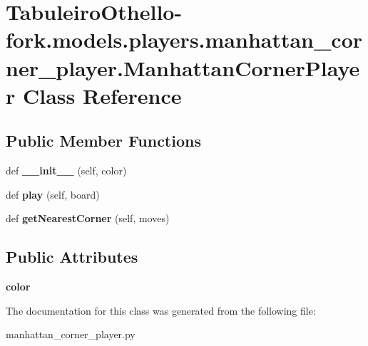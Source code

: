\hypertarget{class_tabuleiro_othello-fork_1_1models_1_1players_1_1manhattan__corner__player_1_1_manhattan_corner_player}{}\section{Tabuleiro\+Othello-\/fork.models.\+players.\+manhattan\+\_\+corner\+\_\+player.\+Manhattan\+Corner\+Player Class Reference}
\label{class_tabuleiro_othello-fork_1_1models_1_1players_1_1manhattan__corner__player_1_1_manhattan_corner_player}
\subsection*{Public Member Functions}
\begin{DoxyCompactItemize}
\item 
\hypertarget{class_tabuleiro_othello-fork_1_1models_1_1players_1_1manhattan__corner__player_1_1_manhattan_corner_player_a3aa3ecc93f83d67e6d2df577948db647}{}def {\bfseries \+\_\+\+\_\+init\+\_\+\+\_\+} (self, color)\label{class_tabuleiro_othello-fork_1_1models_1_1players_1_1manhattan__corner__player_1_1_manhattan_corner_player_a3aa3ecc93f83d67e6d2df577948db647}

\item 
\hypertarget{class_tabuleiro_othello-fork_1_1models_1_1players_1_1manhattan__corner__player_1_1_manhattan_corner_player_a3044a9ec92f9c175462169019c3f3dfd}{}def {\bfseries play} (self, board)\label{class_tabuleiro_othello-fork_1_1models_1_1players_1_1manhattan__corner__player_1_1_manhattan_corner_player_a3044a9ec92f9c175462169019c3f3dfd}

\item 
\hypertarget{class_tabuleiro_othello-fork_1_1models_1_1players_1_1manhattan__corner__player_1_1_manhattan_corner_player_aa02b9b080d54f90c55a77045112f55e1}{}def {\bfseries get\+Nearest\+Corner} (self, moves)\label{class_tabuleiro_othello-fork_1_1models_1_1players_1_1manhattan__corner__player_1_1_manhattan_corner_player_aa02b9b080d54f90c55a77045112f55e1}

\end{DoxyCompactItemize}
\subsection*{Public Attributes}
\begin{DoxyCompactItemize}
\item 
\hypertarget{class_tabuleiro_othello-fork_1_1models_1_1players_1_1manhattan__corner__player_1_1_manhattan_corner_player_a132bb9fea0aaa07c2e0bf0f6b4b70398}{}{\bfseries color}\label{class_tabuleiro_othello-fork_1_1models_1_1players_1_1manhattan__corner__player_1_1_manhattan_corner_player_a132bb9fea0aaa07c2e0bf0f6b4b70398}

\end{DoxyCompactItemize}


The documentation for this class was generated from the following file\+:\begin{DoxyCompactItemize}
\item 
manhattan\+\_\+corner\+\_\+player.\+py\end{DoxyCompactItemize}
